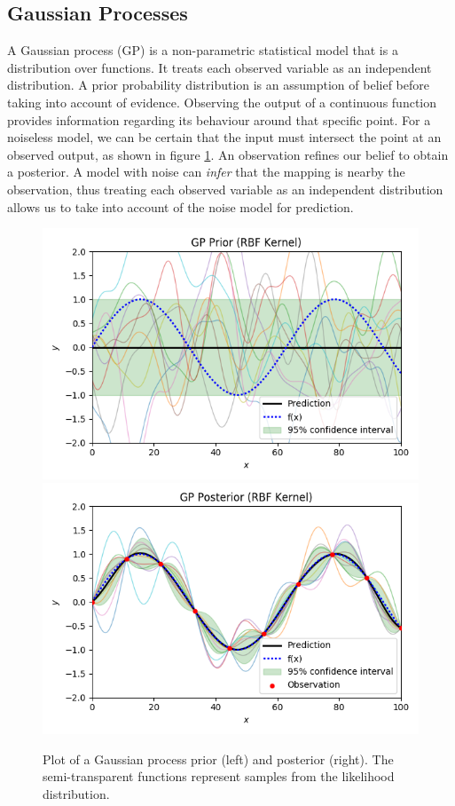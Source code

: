 \documentclass[ %
author={Dillon Keith Diep},
supervisor={Dr. Carl Henrik Ek},
degree={MEng},
title={ART-CG Hair:},
subtitle={Assisted Real-time Content Generation of Stylised Virtual Hair},
type={Research},
year={2017} ]{dissertation}
\begin{document}
\subsection{Gaussian Processes}
A Gaussian process (GP) is a non-parametric statistical model that is a distribution over functions. It treats each observed variable as an independent distribution. A prior probability distribution is an assumption of belief before taking into account of evidence. Observing the output of a continuous function provides information regarding its behaviour around that specific point. For a noiseless model, we can be certain that the input must intersect the point at an observed output, as shown in figure \ref{gpplot}. An observation refines our belief to obtain a posterior. A model with noise can \textit{infer} that the mapping is nearby the observation, thus treating each observed variable as an independent distribution allows us to take into account of the noise model for prediction.

\begin{figure}[!h]
	\centering
	\includegraphics[scale=0.5]{images/gpPrior}
	\includegraphics[scale=0.5]{images/gpPosterior}
	\caption{Plot of a Gaussian process prior (left) and posterior (right). The semi-transparent functions represent samples from the likelihood distribution.}
	\label{gpplot}
\end{figure}
\end{document}
